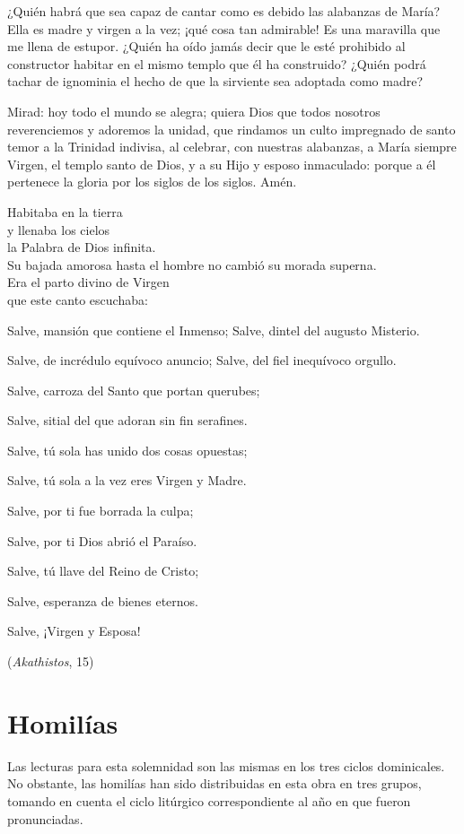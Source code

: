 \begin{body}
\begin{body}
¿Quién habrá que sea capaz de cantar como es debido las alabanzas de María? Ella es madre y virgen a la vez; ¡qué cosa tan admirable! Es una maravilla que me llena de estupor. ¿Quién ha oído jamás decir que le esté prohibido al constructor habitar en el mismo templo que él ha construido? ¿Quién podrá tachar de ignominia el hecho de que la sirviente sea adoptada como madre?

Mirad: hoy todo el mundo se alegra; quiera Dios que todos nosotros reverenciemos y adoremos la unidad, que rindamos un culto impregnado de santo temor a la Trinidad indivisa, al celebrar, con nuestras alabanzas, a María siempre Virgen, el templo santo de Dios, y a su Hijo y esposo inmaculado: porque a él pertenece la gloria por los siglos de los siglos. Amén.


Habitaba en la tierra\\ y llenaba los cielos\\ la Palabra de Dios infinita.\\ Su bajada amorosa hasta el hombre no cambió su morada superna.\\ Era el parto divino de Virgen\\ que este canto escuchaba:

Salve, mansión que contiene el Inmenso; Salve, dintel del augusto Misterio.

Salve, de incrédulo equívoco anuncio; Salve, del fiel inequívoco orgullo.

Salve, carroza del Santo que portan querubes;

Salve, sitial del que adoran sin fin serafines.

Salve, tú sola has unido dos cosas opuestas;

Salve, tú sola a la vez eres Virgen y Madre.

Salve, por ti fue borrada la culpa;

Salve, por ti Dios abrió el Paraíso.

Salve, tú llave del Reino de Cristo;

Salve, esperanza de bienes eternos.

Salve, ¡Virgen y Esposa!

(\emph{Akathistos}, 15)

\section{Homilías}

Las lecturas para esta solemnidad son las mismas en los tres ciclos dominicales. No obstante, las homilías han sido distribuidas en esta obra en tres grupos, tomando en cuenta el ciclo litúrgico correspondiente al año en que fueron pronunciadas.


\end{body}
\end{body}
